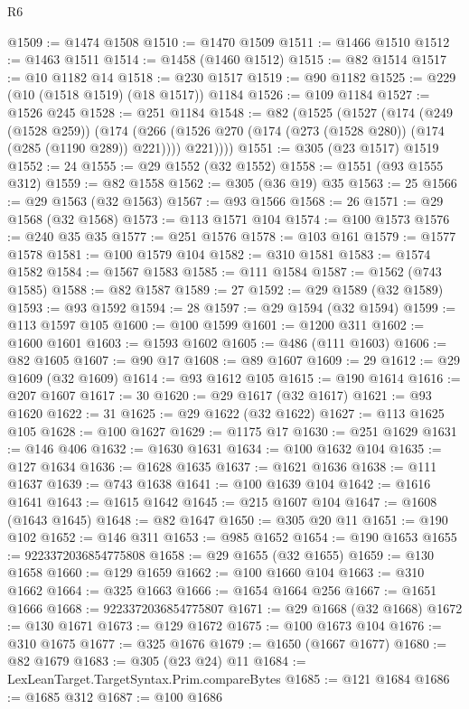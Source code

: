 \begin{lexlean}{R6}
\begin{coremodule}
@1509 := @1474 @1508
@1510 := @1470 @1509
@1511 := @1466 @1510
@1512 := @1463 @1511
@1514 := @1458 (@1460 @1512)
@1515 := @82 @1514
@1517 := @10 @1182 @14
@1518 := @230 @1517
@1519 := @90 @1182
@1525 := @229 (@10 (@1518 @1519) (@18 @1517)) @1184
@1526 := @109 @1184
@1527 := @1526 @245
@1528 := @251 @1184
@1548 := @82
    (@1525
      (@1527
        (@174
          (@249 (@1528 @259))
          (@174
            (@266 (@1526 @270 (@174 (@273 (@1528 @280)) (@174 (@285 (@1190 @289)) @221))))
            @221))))
@1551 := @305 (@23 @1517) @1519
@1552 := 24
@1555 := @29 @1552 (@32 @1552)
@1558 := @1551 (@93 @1555 @312)
@1559 := @82 @1558
@1562 := @305 (@36 @19) @35
@1563 := 25
@1566 := @29 @1563 (@32 @1563)
@1567 := @93 @1566
@1568 := 26
@1571 := @29 @1568 (@32 @1568)
@1573 := @113 @1571 @104
@1574 := @100 @1573
@1576 := @240 @35 @35
@1577 := @251 @1576
@1578 := @103 @161
@1579 := @1577 @1578
@1581 := @100 @1579 @104
@1582 := @310 @1581
@1583 := @1574 @1582
@1584 := @1567 @1583
@1585 := @111 @1584
@1587 := @1562 (@743 @1585)
@1588 := @82 @1587
@1589 := 27
@1592 := @29 @1589 (@32 @1589)
@1593 := @93 @1592
@1594 := 28
@1597 := @29 @1594 (@32 @1594)
@1599 := @113 @1597 @105
@1600 := @100 @1599
@1601 := @1200 @311
@1602 := @1600 @1601
@1603 := @1593 @1602
@1605 := @486 (@111 @1603)
@1606 := @82 @1605
@1607 := @90 @17
@1608 := @89 @1607
@1609 := 29
@1612 := @29 @1609 (@32 @1609)
@1614 := @93 @1612 @105
@1615 := @190 @1614
@1616 := @207 @1607
@1617 := 30
@1620 := @29 @1617 (@32 @1617)
@1621 := @93 @1620
@1622 := 31
@1625 := @29 @1622 (@32 @1622)
@1627 := @113 @1625 @105
@1628 := @100 @1627
@1629 := @1175 @17
@1630 := @251 @1629
@1631 := @146 @406
@1632 := @1630 @1631
@1634 := @100 @1632 @104
@1635 := @127 @1634
@1636 := @1628 @1635
@1637 := @1621 @1636
@1638 := @111 @1637
@1639 := @743 @1638
@1641 := @100 @1639 @104
@1642 := @1616 @1641
@1643 := @1615 @1642
@1645 := @215 @1607 @104
@1647 := @1608 (@1643 @1645)
@1648 := @82 @1647
@1650 := @305 @20 @11
@1651 := @190 @102
@1652 := @146 @311
@1653 := @985 @1652
@1654 := @190 @1653
@1655 := 9223372036854775808
@1658 := @29 @1655 (@32 @1655)
@1659 := @130 @1658
@1660 := @129 @1659
@1662 := @100 @1660 @104
@1663 := @310 @1662
@1664 := @325 @1663
@1666 := @1654 @1664 @256
@1667 := @1651 @1666
@1668 := 9223372036854775807
@1671 := @29 @1668 (@32 @1668)
@1672 := @130 @1671
@1673 := @129 @1672
@1675 := @100 @1673 @104
@1676 := @310 @1675
@1677 := @325 @1676
@1679 := @1650 (@1667 @1677)
@1680 := @82 @1679
@1683 := @305 (@23 @24) @11
@1684 := LexLeanTarget.TargetSyntax.Prim.compareBytes
@1685 := @121 @1684
@1686 := @1685 @312
@1687 := @100 @1686

\end{coremodule}
\end{lexlean}
